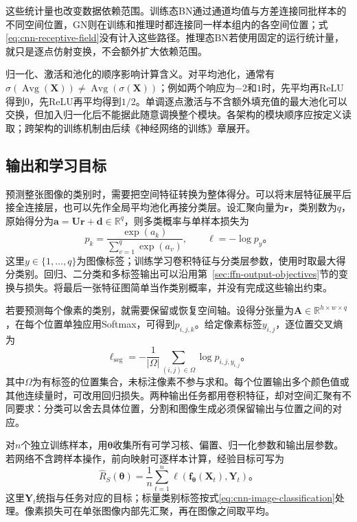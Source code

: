 这些统计量也改变数据依赖范围。训练态BN通过通道均值与方差连接同批样本的不同空间位置，GN则在训练和推理时都连接同一样本组内的各空间位置；式\eqref{eq:cnn-receptive-field}没有计入这些路径。推理态BN若使用固定的运行统计量，就只是逐点仿射变换，不会额外扩大依赖范围。

归一化、激活和池化的顺序影响计算含义。对平均池化，通常有$\sigma(\operatorname{Avg}(\bm X))\neq\operatorname{Avg}(\sigma(\bm X))$；例如两个响应为$-2$和$1$时，先平均再ReLU得到$0$，先ReLU再平均得到$1/2$。单调逐点激活与不含额外填充值的最大池化可以交换，但加入归一化后不能据此随意调换整个模块。各架构的模块顺序应按定义读取；跨架构的训练机制由后续《神经网络的训练》章展开。

\subsection{输出和学习目标}
\label{sec:cnn-output-objectives}

预测整张图像的类别时，需要把空间特征转换为整体得分。可以将末层特征展平后接全连接层，也可以先作全局平均池化再接分类层。设汇聚向量为$\bm r$，类别数为$q$，原始得分为$\bm a=\bm U\bm r+\bm d\in\mathbb R^q$，则多类概率与单样本损失为
\begin{equation}
  p_k=\frac{\exp(a_k)}{\sum_{v=1}^{q}\exp(a_v)},\qquad
  \ell=-\log p_y\text{。}
  \label{eq:cnn-image-classification}
\end{equation}
这里$y\in\{1,\ldots,q\}$为图像标签；训练学习卷积特征与分类层参数，使用时取最大得分类别。回归、二分类和多标签输出可以沿用第~\ref{sec:ffn-output-objectives}节的变换与损失。将最后一张特征图简单当作类别概率，并没有完成这些输出约束。

若要预测每个像素的类别，就需要保留或恢复空间轴。设得分张量为$\bm A\in\mathbb R^{h\times w\times q}$，在每个位置单独应用Softmax，可得到$p_{i,j,k}$。给定像素标签$y_{i,j}$，逐位置交叉熵为
\begin{equation}
  \ell_{\mathrm{seg}}=-\frac1{|\Omega|}
    \sum_{(i,j)\in\Omega}\log p_{i,j,y_{i,j}}\text{。}
  \label{eq:cnn-segmentation-loss}
\end{equation}
其中$\Omega$为有标签的位置集合，未标注像素不参与求和。每个位置输出多个颜色值或其他连续量时，可改用回归损失。两种输出任务都用卷积特征，却对空间汇聚有不同要求：分类可以舍去具体位置，分割和图像生成必须保留输出与位置之间的对应。

对$n$个独立训练样本，用$\bm\theta$收集所有可学习核、偏置、归一化参数和输出层参数。若网络不含跨样本操作，前向映射可逐样本计算，经验目标可写为
\begin{equation}
  \widehat R_S(\bm\theta)=\frac1n\sum_{t=1}^{n}
    \ell\!\left(\bm f_{\bm\theta}(\bm X_t),\bm Y_t\right)\text{。}
  \label{eq:cnn-training-objective}
\end{equation}
这里$\bm Y_t$统指与任务对应的目标；标量类别标签按式\eqref{eq:cnn-image-classification}处理。像素损失可在单张图像内部先汇聚，再在图像之间取平均。

